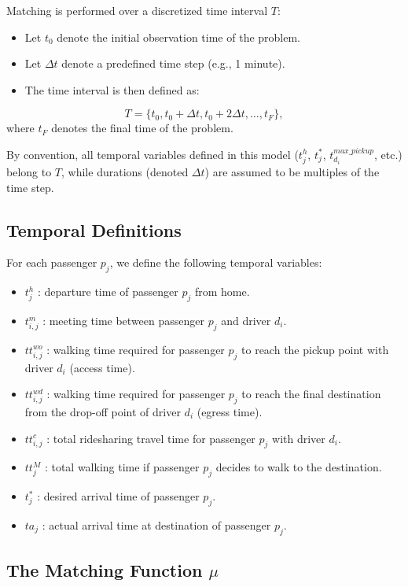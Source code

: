 \documentclass[12pt, a4paper]{article}
\begin{document}
Matching is performed over a discretized time interval $T$:

\begin{itemize}
    \item Let $t_0$ denote the initial observation time of the problem.
    \item Let $\Delta t$ denote a predefined time step (e.g., 1 minute).
    \item The time interval is then defined as:
\end{itemize}
\[
T=\{t_0,t_0+\Delta t,t_0+2\Delta t,\ldots,t_F\},
\]
where $t_F$ denotes the final time of the problem.

By convention, all temporal variables defined in this model
($t_j^h$, $t_j^*$, $t_{d_i}^{max\_pickup}$, etc.) belong to $T$, while durations (denoted $\Delta t$) are assumed to be multiples of the time step.

\subsection{Temporal Definitions}

For each passenger $p_j$, we define the following temporal variables:

\begin{itemize}
    \item $t_j^h$ : departure time of passenger $p_j$ from home.
    \item $t_{i,j}^m$ : meeting time between passenger $p_j$ and driver $d_i$.
    \item $tt_{i,j}^{wo}$ : walking time required for passenger $p_j$ to reach the pickup point with driver $d_i$ (access time).
    \item $tt_{i,j}^{wd}$ : walking time required for passenger $p_j$ to reach the final destination from the drop-off point of driver $d_i$ (egress time).
    \item $tt_{i,j}^{c}$ : total ridesharing travel time for passenger $p_j$ with driver $d_i$.
    \item $tt_j^{M}$ : total walking time if passenger $p_j$ decides to walk to the destination.
    \item $t_j^*$ : desired arrival time of passenger $p_j$.
    \item $ta_j$ : actual arrival time at destination of passenger $p_j$.
\end{itemize}

\subsection{The Matching Function $\mu$}
\end{document}
